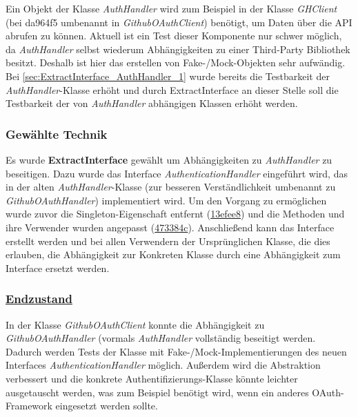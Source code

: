 \documentclass[12pt]{article}
\begin{document}
Ein Objekt der Klasse \textit{AuthHandler} wird zum Beispiel in der Klasse \textit{GHClient} (bei da964f5 umbenannt in \textit{GithubOAuthClient}) benötigt, um Daten über die API abrufen zu können. Aktuell ist ein Test dieser Komponente nur schwer möglich, da \textit{AuthHandler} selbst wiederum Abhängigkeiten zu einer Third-Party Bibliothek besitzt. Deshalb ist hier das erstellen von Fake-/Mock-Objekten sehr aufwändig. Bei \ref{sec:ExtractInterface_AuthHandler_1} wurde bereits die Testbarkeit der \textit{AuthHandler}-Klasse erhöht und durch ExtractInterface an dieser Stelle soll die Testbarkeit der von \textit{AuthHandler} abhängigen Klassen erhöht werden.

\subsubsection*{Gewählte Technik}

Es wurde \textbf{ExtractInterface} gewählt um Abhängigkeiten zu \textit{AuthHandler} zu beseitigen. Dazu wurde das Interface \textit{AuthenticationHandler} eingeführt wird, das in der alten \textit{AuthHandler}-Klasse (zur besseren Verständlichkeit umbenannt zu \textit{GithubOAuthHandler}) implementiert wird. 
Um den Vorgang zu ermöglichen wurde zuvor die Singleton-Eigenschaft entfernt (\href{https://github.com/lukaspanni/OpenSourceStats/commit/13efee847af5b7627391d2ae6309b800727c51fd}{13efee8}) und die Methoden und ihre Verwender wurden angepasst (\href{https://github.com/lukaspanni/OpenSourceStats/commit/473384cdb4bc8e9f8269af865cf210923c42b5c5}{473384c}). 
Anschließend kann das Interface erstellt werden und bei allen Verwendern der Ursprünglichen Klasse, die dies erlauben, die Abhängigkeit zur Konkreten Klasse durch eine Abhängigkeit zum Interface ersetzt werden.

\subsubsection*{\href{https://github.com/lukaspanni/OpenSourceStats/tree/da964f5d7e2485f28cf19b4ec178b92805538adc/app/src/main/java/de/lukaspanni/opensourcestats/auth}{Endzustand}}

In der Klasse \textit{GithubOAuthClient} konnte die Abhängigkeit zu \textit{GithubOAuthHandler} (vormals \textit{AuthHandler} vollständig beseitigt werden.
 Dadurch werden Tests der Klasse mit Fake-/Mock-Implementierungen des neuen Interfaces \textit{AuthenticationHandler} möglich. 
Außerdem wird die Abstraktion verbessert und die konkrete Authentifizierungs-Klasse könnte leichter ausgetauscht werden, was zum Beispiel benötigt wird, wenn ein anderes OAuth-Framework eingesetzt werden sollte.
\end{document}
